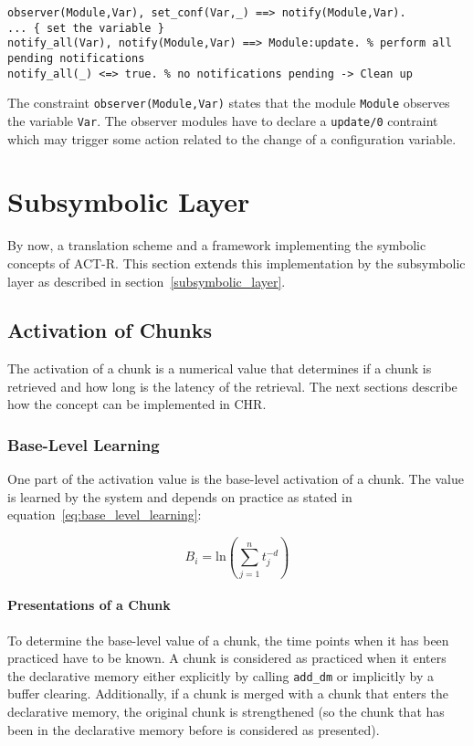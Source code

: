 \begin{lstlisting}
observer(Module,Var), set_conf(Var,_) ==> notify(Module,Var).
... { set the variable }
notify_all(Var), notify(Module,Var) ==> Module:update. % perform all pending notifications
notify_all(_) <=> true. % no notifications pending -> Clean up
\end{lstlisting}

The constraint \lstinline|observer(Module,Var)| states that the module \lstinline|Module| observes the variable \lstinline|Var|. The observer modules have to declare a \lstinline|update/0| contraint which may trigger some action related to the change of a configuration variable.

\section{Subsymbolic Layer}

By now, a translation scheme and a framework implementing the symbolic concepts of ACT-R. This section extends this implementation by the subsymbolic layer as described in section~\ref{subsymbolic_layer}.

\subsection{Activation of Chunks}

The activation of a chunk is a numerical value that determines if a chunk is retrieved and how long is the latency of the retrieval. The next sections describe how the concept can be implemented in CHR.

\subsubsection{Base-Level Learning}

One part of the activation value is the base-level activation of a chunk. The value is learned by the system and depends on practice as stated in equation~\eqref{eq:base_level_learning}:

\begin{equation*}
B_i = \mathrm{ln}\left(\sum_{j=1}^n{t_j^{-d}}\right) 
\end{equation*}

\paragraph{Presentations of a Chunk} 

To determine the base-level value of a chunk, the time points when it has been practiced have to be known. A chunk is considered as practiced when it enters the declarative memory either explicitly by calling \lstinline|add_dm| or implicitly by a buffer clearing. Additionally, if a chunk is merged with a chunk that enters the declarative memory, the original chunk is strengthened (so the chunk that has been in the declarative memory before is considered as presented). 

